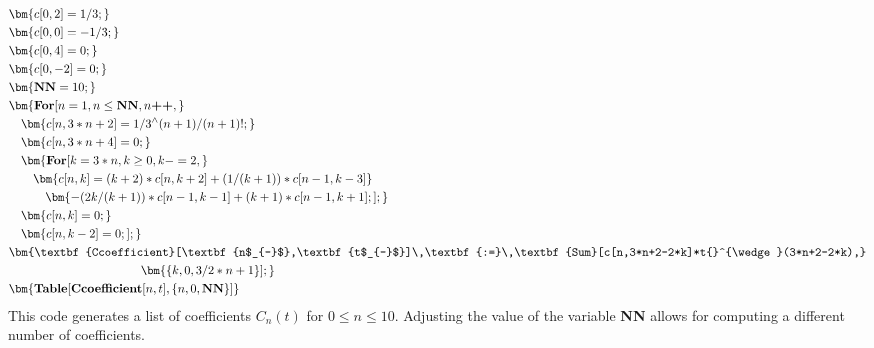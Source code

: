 \[
\begin{aligned}
&\bm{c[0,2] = 1/3;} \\
&\bm{c[0,0] = -1/3;} \\
&\bm{c[0,4] = 0;} \\
&\bm{c[0,-2] = 0;} \\
&\bm{\textbf{NN} = 10;} \\
&\bm{\textbf{For}[n = 1, n \leq \textbf{NN}, n\textbf{++},} \\
&\quad \bm{c[n,3*n+2] = 1/3{}^{\wedge}(n+1)/(n+1)!;} \\
&\quad \bm{c[n,3*n+4] = 0;} \\
&\quad \bm{\textbf{For}[k = 3*n, k \geq 0, k-=2,} \\
&\quad \quad \bm{c[n,k] = (k+2)*c[n,k+2] + (1/(k+1))*c[n-1,k-3]} \\
&\quad \quad \quad \bm{- (2k/(k+1))*c[n-1,k-1] + (k+1)*c[n-1,k+1];];} \\
&\quad \bm{c[n,k] = 0;} \\
&\quad \bm{c[n,k-2] = 0;];} \\
&\bm{\textbf{Ccoefficient}[\textbf{n$_{-}$},\textbf{t$_{-}$}]\,\textbf{:=}\,\textbf{Sum}[c[n,3*n+2-2*k]*t{}^{\wedge}(3*n+2-2*k),}\\
& \hphantom{\textbf{Ccoefficient}[\textbf{n$_{-}$},\textbf{t$_{-}$}]\,\textbf{:=}\,} \bm{\{k,0,3/2*n+1\}];} \\
&\bm{\textbf{Table}[\textbf{Ccoefficient}[n,t],\{n,0,\textbf{NN}\}]}
\end{aligned}
\]
This code generates a list of coefficients $C_n(t)$ for $0\le n\le 10$. Adjusting the value of the variable \textbf{NN} allows for computing a different number of coefficients.
